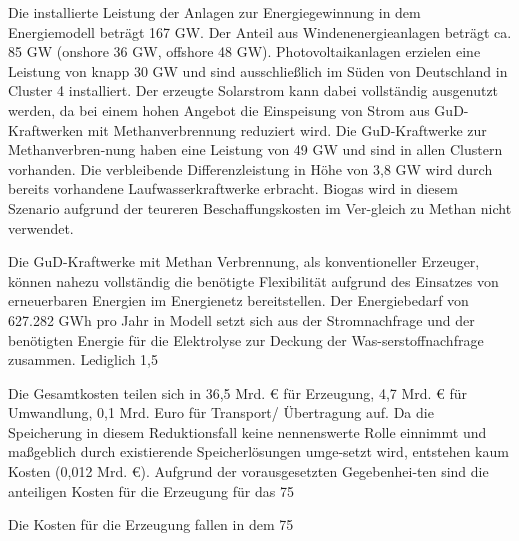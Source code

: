 Die installierte Leistung der Anlagen zur Energiegewinnung in dem Energiemodell beträgt 167 GW. Der Anteil aus Windenenergieanlagen beträgt ca. 85 GW (onshore 36 GW, offshore 48 GW). Photovoltaikanlagen erzielen eine Leistung von knapp 30 GW und sind ausschließlich im Süden von Deutschland in Cluster 4 installiert. Der erzeugte Solarstrom kann dabei vollständig ausgenutzt werden, da bei einem hohen Angebot die Einspeisung von Strom aus GuD-Kraftwerken mit Methanverbrennung reduziert wird. Die GuD-Kraftwerke zur Methanverbren-nung haben eine Leistung von 49 GW und sind in allen Clustern vorhanden. Die verbleibende Differenzleistung in Höhe von 3,8 GW wird durch bereits vorhandene Laufwasserkraftwerke erbracht. Biogas wird in diesem Szenario aufgrund der teureren Beschaffungskosten im Ver-gleich zu Methan nicht verwendet. 

Die GuD-Kraftwerke mit Methan Verbrennung, als konventioneller Erzeuger, können nahezu vollständig die benötigte Flexibilität aufgrund des Einsatzes von erneuerbaren Energien im Energienetz bereitstellen. Der Energiebedarf von 627.282 GWh pro Jahr in Modell setzt sich aus der Stromnachfrage und der benötigten Energie für die Elektrolyse zur Deckung der Was-serstoffnachfrage zusammen. Lediglich 1,5 %

Die Gesamtkosten teilen sich in 36,5 Mrd. € für Erzeugung, 4,7 Mrd. € für Umwandlung, 0,1 Mrd. Euro für Transport/ Übertragung auf. Da die Speicherung in diesem Reduktionsfall keine nennenswerte Rolle einnimmt und maßgeblich durch existierende Speicherlösungen umge-setzt wird, entstehen kaum Kosten (0,012 Mrd. €). Aufgrund der vorausgesetzten Gegebenhei-ten sind die anteiligen Kosten für die Erzeugung für das 75 %

Die Kosten für die Erzeugung fallen in dem 75 %

